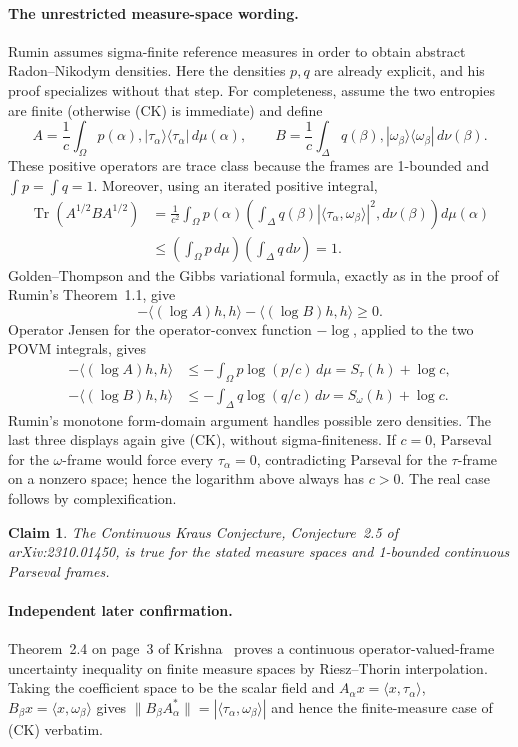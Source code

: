 \documentclass[11pt]{article}
\newtheorem*{claim}{Claim}
\newcommand{\Tr}{\operatorname{Tr}}
\begin{document}
\paragraph{The unrestricted measure-space wording.}
Rumin assumes sigma-finite reference measures in order to obtain abstract
Radon--Nikodym densities.  Here the densities $p,q$ are already explicit, and
his proof specializes without that step.  For completeness, assume the two
entropies are finite (otherwise \textup{(CK)} is immediate) and define
\[
 A=\frac1c\int_\Omega p(\alpha),|\tau_\alpha\rangle
      \langle\tau_\alpha|\,d\mu(\alpha),
 \qquad
 B=\frac1c\int_\Delta q(\beta),|\omega_\beta\rangle
      \langle\omega_\beta|\,d\nu(\beta).
\]
These positive operators are trace class because the frames are 1-bounded
and $\int p=\int q=1$.  Moreover, using an iterated positive integral,
\begin{align*}
 \Tr(A^{1/2}BA^{1/2})
 &=\frac1{c^2}\int_\Omega p(\alpha)
      \left(\int_\Delta q(\beta)
       |\langle\tau_\alpha,\omega_\beta\rangle|^2,d\nu(\beta)\right)
       d\mu(\alpha)\\
 &\le \left(\int_\Omega p\,d\mu\right)
       \left(\int_\Delta q\,d\nu\right)=1.
\end{align*}
Golden--Thompson and the Gibbs variational formula, exactly as in the proof
of Rumin's Theorem~1.1, give
\[
 -\langle(\log A)h,h\rangle-\langle(\log B)h,h\rangle\ge0.
\]
Operator Jensen for the operator-convex function $-\log$, applied to the two
POVM integrals, gives
\begin{align*}
 -\langle(\log A)h,h\rangle
 &\le -\int_\Omega p\log(p/c)\,d\mu=S_\tau(h)+\log c,\\
 -\langle(\log B)h,h\rangle
 &\le -\int_\Delta q\log(q/c)\,d\nu=S_\omega(h)+\log c.
\end{align*}
Rumin's monotone form-domain argument handles possible zero densities.  The
last three displays again give \textup{(CK)}, without sigma-finiteness.
If $c=0$, Parseval for the $\omega$-frame would force every $\tau_\alpha=0$,
contradicting Parseval for the $\tau$-frame on a nonzero space; hence the
logarithm above always has $c>0$.  The real case follows by complexification.

\begin{claim}
The Continuous Kraus Conjecture, Conjecture~2.5 of arXiv:2310.01450, is true
for the stated measure spaces and 1-bounded continuous Parseval frames.
\end{claim}

\paragraph{Independent later confirmation.}
Theorem~2.4 on page~3 of Krishna~\cite{Krishna2024} proves a continuous
operator-valued-frame uncertainty inequality on finite measure spaces by
Riesz--Thorin interpolation.  Taking the coefficient space to be the scalar
field and
$A_\alpha x=\langle x,\tau_\alpha\rangle$,
$B_\beta x=\langle x,\omega_\beta\rangle$ gives
$\|B_\beta A_\alpha^*\|=|\langle\tau_\alpha,\omega_\beta\rangle|$ and hence
the finite-measure case of \textup{(CK)} verbatim.
\end{document}
